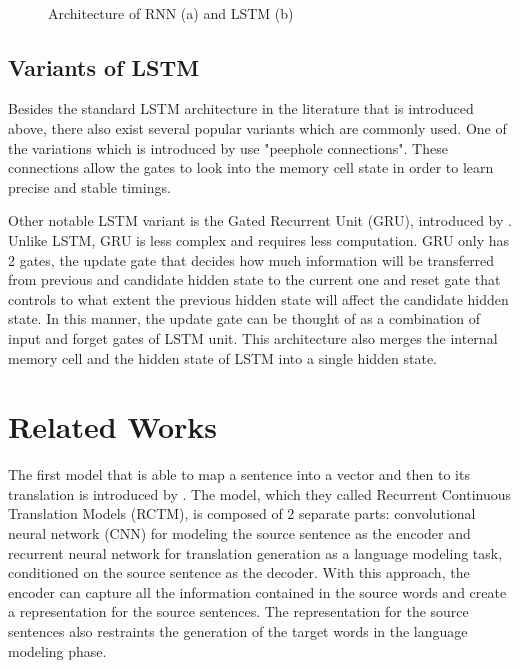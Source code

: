\documentclass[12pt]{extarticle}
\begin{document}
\begin{figure}[ht]
\centering
{} \\

\caption{Architecture of RNN (a) and LSTM (b)}
\label{fig:rnn}
\end{figure}

\subsection*{Variants of LSTM}
Besides the standard LSTM architecture in the literature that is introduced above, there also exist several popular variants which are commonly used. One of the variations which is introduced by \citep{DBLP:conf/ijcnn/GersS00} use "peephole connections". These connections allow the gates to look into the memory cell state in order to learn precise and stable timings. 

Other notable LSTM variant is the Gated Recurrent Unit (GRU), introduced by \citep{cho-etal-2014-learning}. Unlike LSTM, GRU is less complex and requires less computation. GRU only has 2 gates, the update gate that decides how much information will be transferred from previous and candidate hidden state to the current one and reset gate that controls to what extent the previous hidden state will affect the candidate hidden state. In this manner, the update gate can be thought of as a combination of input and forget gates of LSTM unit. This architecture also merges the internal memory cell and the hidden state of LSTM into a single hidden state.

\section*{Related Works}
The first model that is able to map a sentence into a vector and then to its translation is introduced by \citep{kalchbrenner-blunsom-2013-recurrent-continuous}. The model, which they called Recurrent Continuous Translation Models (RCTM), is composed of 2 separate parts: convolutional neural network (CNN) for modeling the source sentence as the encoder and recurrent neural network for translation generation as a language modeling task, conditioned on the source sentence as the decoder. With this approach, the encoder can capture all the information contained in the source words and create a representation for the source sentences. The representation for the source sentences also restraints the generation of the target words in the language modeling phase.
\end{document}
